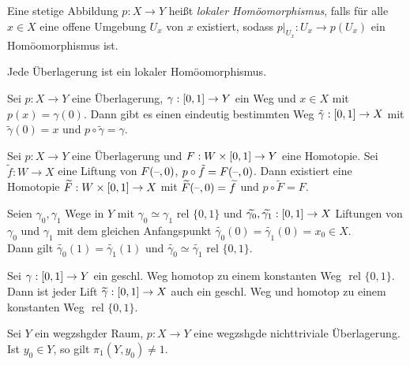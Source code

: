 \documentclass{cheat-sheet}
\newcommand{\rel}{\text{ rel }} %
\begin{document}
\begin{defn}
  Eine stetige Abbildung $p : X \to Y$ heißt \emph{lokaler Homöomorphismus}, falls für alle $x \in X$ eine offene Umgebung $U_x$ von $x$ existiert, sodass $p|_{U_x} : U_x \to p(U_x)$ ein Homöomorphismus ist.
\end{defn}

\begin{lem}
  Jede Überlagerung ist ein lokaler Homöomorphismus.
\end{lem}

\begin{prop}
  Sei $p : X \to Y$ eine Überlagerung, $\gamma : \left[ 0, 1 \right] \to Y$ ein Weg und $x \in X$ mit $p(x) = \gamma(0)$. Dann gibt es einen eindeutig bestimmten Weg $\tilde{\gamma} : \left[ 0, 1 \right] \to X$ mit $\tilde{\gamma}(0) = x$ und $p \circ \tilde{\gamma} = \gamma$.
\end{prop}


\begin{satz}
  Sei $p : X \to Y$ eine Überlagerung und $F : W \times \left[ 0, 1 \right] \to Y$ eine Homotopie. Sei $\tilde{f} : W \to X$ eine Liftung von $F(\text{--}, 0)$, \dh{} $p \circ \tilde{f} = F(\text{--}, 0)$. Dann existiert eine Homotopie $\widetilde{F} : W \times \left[ 0, 1 \right] \to X$ mit $\widetilde{F}(\text{--}, 0) = \widetilde{f}$ und $p \circ \widetilde{F} = F$.
\end{satz}

\begin{kor}
  Seien $\gamma_0, \gamma_1$ Wege in $Y$ mit $\gamma_0 \simeq \gamma_1 \rel \{ 0, 1 \}$ und $\widetilde{\gamma_0}, \widetilde{\gamma_1} : \left[ 0, 1 \right] \to X$ Liftungen von $\gamma_0$ und $\gamma_1$ mit dem gleichen Anfangspunkt $\widetilde{\gamma_0}(0) = \widetilde{\gamma_1}(0) = x_0 \in X$. \\
  Dann gilt $\widetilde{\gamma_0}(1) = \widetilde{\gamma_1}(1)$ und $\widetilde{\gamma_0} \simeq \widetilde{\gamma_1} \rel \{ 0, 1 \}$.
\end{kor}

\begin{kor}
  Sei $\gamma : \left[ 0, 1 \right] \to Y$ ein geschl. Weg homotop zu einem konstanten Weg $\rel \{ 0, 1 \}$. Dann ist jeder Lift $\widetilde{\gamma} : \left[ 0, 1 \right] \to X$ auch ein geschl. Weg und homotop zu einem konstanten Weg $\rel \{ 0, 1 \}$.
\end{kor}

\begin{kor}
  Sei $Y$ ein wegzshgder Raum, $p : X \to Y$ eine wegzshgde nichttriviale Überlagerung. Ist $y_0 \in Y$, so gilt $\pi_1(Y, y_0) \not= 1$.
\end{kor}
\end{document}
